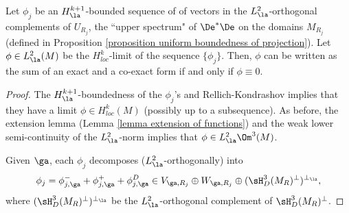 \documentclass[hidelinks, 12pt, oneside, reqno]{amsart}
\begin{document}
\begin{cor}\label{corollary small eigenvalues become harmonic}
    Let $\phi_j$ be an $H^{k+1}_{\la}$-bounded sequence of of vectors in the $L^2_{\la}$-orthogonal complements of $U_{R_j}$, the ``upper spectrum" of $\De^*\De$ on the domains $M_{R_j}$ (defined in Proposition \ref{proposition uniform boundedness of projection}). Let $\phi \in L^2_{\la}(M)$ be the $H^k_{loc}$-limit of the sequence $\{\phi_j\}$. Then, $\phi$ can be written as the sum of an exact and a co-exact form if and only if $\phi \equiv 0$.
\end{cor}

\begin{proof}
    The $H^{k+1}_{\la}$-boundedness of the $\phi_j$'s and Rellich-Kondrashov implies that they have a limit $\phi \in H^k_{loc}(M)$ (possibly up to a subsequence). As before, the extension lemma (Lemma \ref{lemma extension of functions}) and the weak lower semi-continuity of the $L^2_{\la}$-norm implies that $\phi \in L^2_{\la} \Om^3 (M)$. 

    Given $\ga$, each $\phi_j$ decomposes ($L^2_{\la}$-orthogonally) into 
    \[
    \phi_j = \phi_{j,\ga}^- + \phi_{j, \ga}^+ + \phi_{j,\ga}^D \in V_{\ga,R_j} \oplus W_{\ga, R_j} \oplus (\sH^3_D(M_R)^\perp)^{\perp_\la},
    \]
    where $(\sH^3_D(M_R)^\perp)^{\perp_\la}$ be the $L^2_\la$-orthogonal complement of $\sH^3_D(M_R)^\perp$.
    

\end{proof}
\end{document}
